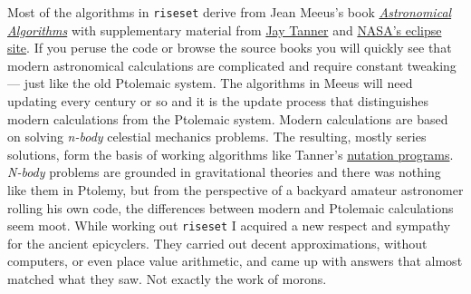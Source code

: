 Most of the algorithms in \texttt{riseset} derive from Jean Meeus's book
\href{https://archive.org/details/astronomicalalgorithmsjeanmeeus1991}{\emph{Astronomical
Algorithms}} with supplementary material from
\href{https://neoprogrammics.com/nutations/}{Jay Tanner} and
\href{https://eclipse.gsfc.nasa.gov/SEhelp/deltatpoly2004.html}{NASA's
eclipse site}. If you peruse the code or browse the source books you
will quickly see that modern astronomical calculations are complicated
and require constant tweaking --- just like the old Ptolemaic system.
The algorithms in Meeus will need updating every century or so and it is
the update process that distinguishes modern calculations from the
Ptolemaic system. Modern calculations are based on solving \emph{n-body}
celestial mechanics problems. The resulting, mostly series solutions,
form the basis of working algorithms like Tanner's
\href{https://neoprogrammics.com/nutations/}{nutation programs}.
\emph{N-body} problems are grounded in gravitational theories and there
was nothing like them in Ptolemy, but from the perspective of a backyard
amateur astronomer rolling his own code, the differences between modern
and Ptolemaic calculations seem moot. While working out \texttt{riseset} I
acquired a new respect and sympathy for the ancient epicyclers. They
carried out decent approximations, without computers, or even place
value arithmetic, and came up with answers that almost matched what they
saw. Not exactly the work of morons.



%
 

